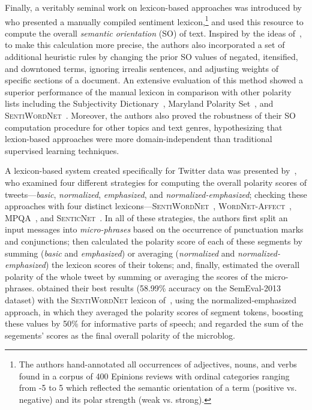 Finally, a veritably seminal work on lexicon-based approaches was
introduced by~\citet{Taboada:11} who presented a manually compiled
sentiment lexicon,\footnote{The authors hand-annotated all occurrences
  of adjectives, nouns, and verbs found in a corpus of 400 Epinions
  reviews with ordinal categories ranging from -5 to 5 which reflected
  the semantic orientation of a term (positive vs. negative) and its
  polar strength (weak vs. strong).} and used this resource to compute
the overall \emph{semantic orientation} (SO) of text.  Inspired by the
ideas of~\citet{Polanyi:06}, to make this calculation more precise,
the authors also incorporated a set of additional heuristic rules by
changing the prior SO values of negated, itensified, and downtoned
terms, ignoring irrealis sentences, and adjusting weights of specific
sections of a document.  An extensive evaluation of this method showed
a superior performance of the manual lexicon in comparison with other
polarity lists including the Subjectivity Dictionary~\cite{Wilson:05},
Maryland Polarity Set~\cite{Mohammad:09}, and
\textsc{SentiWordNet}~\cite{Esuli:06c}.  Moreover, the authors also
proved the robustness of their SO computation procedure for other
topics and text genres, hypothesizing that lexion-based approaches
were more domain-independent than traditional supervised learning
techniques.

A lexicon-based system created specifically for Twitter data was
presented by~\citet{Musto:14}, who examined four different strategies
for computing the overall polarity scores of tweets---\emph{basic},
\emph{normalized}, \emph{emphasized}, and
\emph{normalized-emphasized}; checking these approaches with four
distinct lexicons---\textsc{SentiWordNet}~\cite{Esuli:06c},
\textsc{WordNet-Affect}~\cite{Strapparava:04},
\textsc{MPQA}~\cite{Wiebe:05}, and
\textsc{SenticNet}~\cite{Cambria:14}.  In all of these strategies, the
authors first split an input messages into \emph{micro-phrases} based
on the occurrence of punctuation marks and conjunctions; then
calculated the polarity score of each of these segments by summing
(\emph{basic} and \emph{emphasized}) or averaging (\emph{normalized}
and \emph{normalized-emphasized}) the lexicon scores of their tokens;
and, finally, estimated the overall polarity of the whole tweet by
summing or averaging the scores of the micro-phrases.
\citeauthor{Musto:14} obtained their best results (58.99\% accuracy on
the SemEval-2013 dataset) with the \textsc{SentiWordNet} lexicon
of~\citet{Esuli:06c}, using the normalized-emphasized approach, in
which they averaged the polarity scores of segment tokens, boosting
these values by 50\% for informative parts of speech; and regarded the
sum of the segements' scores as the final overall polarity of the
microblog.

